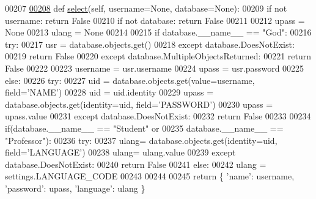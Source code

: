 \begin{DoxyCode}
00207 
\hypertarget{LoginUnit_8py_source_l00208}{}\hyperlink{classLogin_1_1LoginUnit_1_1PersLogin_a1847dbd744377283add2327d2eb0b99f}{00208}     \textcolor{keyword}{def }\hyperlink{classLogin_1_1LoginUnit_1_1PersLogin_a1847dbd744377283add2327d2eb0b99f}{select}(self, username=None, database=None):
00209         \textcolor{keywordflow}{if} \textcolor{keywordflow}{not} username: \textcolor{keywordflow}{return} \textcolor{keyword}{False}
00210         \textcolor{keywordflow}{if} \textcolor{keywordflow}{not} database: \textcolor{keywordflow}{return} \textcolor{keyword}{False}
00211 
00212         upass = \textcolor{keywordtype}{None}
00213         ulang = \textcolor{keywordtype}{None}
00214 
00215         \textcolor{keywordflow}{if} database.\_\_name\_\_ == \textcolor{stringliteral}{"God"}:
00216             \textcolor{keywordflow}{try}:
00217                 usr = database.objects.get()
00218             \textcolor{keywordflow}{except} database.DoesNotExist:
00219                 \textcolor{keywordflow}{return} \textcolor{keyword}{False}
00220             \textcolor{keywordflow}{except} database.MultipleObjectsReturned:
00221                 \textcolor{keywordflow}{return} \textcolor{keyword}{False}
00222 
00223             username = usr.username
00224             upass = usr.password
00225         \textcolor{keywordflow}{else}:
00226             \textcolor{keywordflow}{try}:
00227                 uid = database.objects.get(value=username, field=\textcolor{stringliteral}{'NAME'})
00228                 uid = uid.identity
00229                 upass = database.objects.get(identity=uid, field=\textcolor{stringliteral}{'PASSWORD'})
00230                 upass = upass.value
00231             \textcolor{keywordflow}{except} database.DoesNotExist:
00232                 \textcolor{keywordflow}{return} \textcolor{keyword}{False}
00233 
00234             if(database.\_\_name\_\_ == \textcolor{stringliteral}{"Student"} \textcolor{keywordflow}{or} 
00235                database.\_\_name\_\_ == \textcolor{stringliteral}{"Professor"}):
00236                 \textcolor{keywordflow}{try}:
00237                     ulang= database.objects.get(identity=uid, field=\textcolor{stringliteral}{'LANGUAGE'})
00238                     ulang= ulang.value
00239                 \textcolor{keywordflow}{except} database.DoesNotExist:
00240                     \textcolor{keywordflow}{return} \textcolor{keyword}{False}
00241             \textcolor{keywordflow}{else}:
00242                 ulang = settings.LANGUAGE\_CODE
00243 
00244 
00245         \textcolor{keywordflow}{return} \{ \textcolor{stringliteral}{'name'}: username, \textcolor{stringliteral}{'password'}: upass, \textcolor{stringliteral}{'language'}: ulang \}
\end{DoxyCode}
